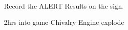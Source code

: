 \documentclass[green]{guildcamp4}
\begin{document}
\name{\gGMSheet{}}

Record the ALERT Results on the sign.

2hrs into game Chivalry Engine explode
\end{document}
